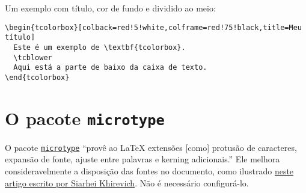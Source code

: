 \documentclass[a4paper]{article}
\newcommand{\code}[1]{\texttt{#1}}
\begin{document}
Um exemplo com título, cor de fundo e dividido ao meio:

\begin{verbatim}
\begin{tcolorbox}[colback=red!5!white,colframe=red!75!black,title=Meu título]
  Este é um exemplo de \textbf{tcolorbox}.
  \tcblower
  Aqui está a parte de baixo da caixa de texto.
\end{tcolorbox}
\end{verbatim}

\section{O pacote \code{microtype}}

O pacote \href{https://www.ctan.org/pkg/microtype}{\code{microtype}} “provê ao
LaTeX extensões [como] protusão de caracteres, expansão de fonte, ajuste entre
palavras e kerning adicionais.” Ele melhora consideravelmente a disposição das
fontes no documento, como ilustrado
\href{http://www.khirevich.com/latex/microtype/}{neste artigo escrito por
Siarhei Khirevich}. Não é necessário configurá-lo.
\end{document}

